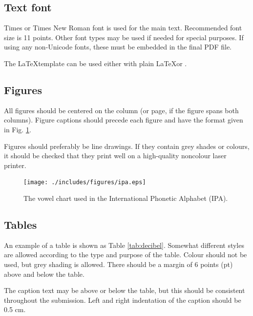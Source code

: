 \documentclass[
  a4paper,
  11pt,
  twocolumn]{article}
\begin{document}
\subsection{Text font}

Times or Times New Roman font is used for the main text. Recommended
font size is 11 points. Other font types may be used if needed for
special purposes. If using any non-Unicode fonts, these must be embedded
in the final PDF file.

The \LaTeX template can be used either with plain \LaTeX or \XeLaTeX.

\subsection{Figures}

All figures should be centered on the column (or page, if the figure
spans both columns). Figure captions should precede each figure and have
the format given in Fig. \ref{fig:vowels}.

Figures should preferably be line drawings. If they contain grey shades
or colours, it should be checked that they print well on a high-quality
noncolour laser printer.

\begin{figure}[!ht]
  \caption{The vowel chart used in the International Phonetic Alphabet (IPA).}
  \label{fig:vowels}
  \begin{center}
  \texttt{[image: ./includes/figures/ipa.eps]}
  \end{center}
\end{figure}

\subsection{Tables}

An example of a table is shown as Table \ref{tab:decibel}. Somewhat
different styles are allowed according to the type and purpose of the
table. Colour should not be used, but grey shading is allowed. There
should be a margin of 6 points (pt) above and below the table.

The caption text may be above or below the table, but this should be
consistent throughout the submission. Left and right indentation of the
caption should be 0.5 cm.
\end{document}

